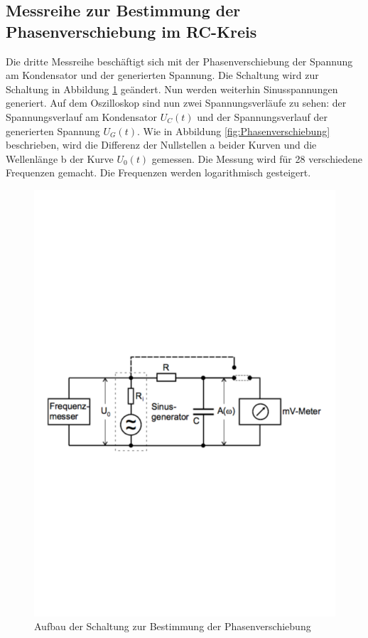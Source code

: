 \subsection{Messreihe zur Bestimmung der Phasenverschiebung im RC-Kreis}
Die dritte Messreihe beschäftigt sich mit der Phasenverschiebung der Spannung am Kondensator und der generierten Spannung.
Die Schaltung wird zur Schaltung in Abbildung \ref{fig:Aufbau2} geändert.
Nun werden weiterhin Sinusspannungen generiert.
Auf dem Oszilloskop sind nun zwei Spannungsverläufe zu sehen: der Spannungsverlauf am Kondensator $U_{C}(t)$ und der Spannungsverlauf der generierten Spannung $U_{G}(t)$.
Wie in Abbildung \ref{fig:Phasenverschiebung} beschrieben, wird die Differenz der Nullstellen a beider Kurven und die Wellenlänge b der Kurve $U_{0}(t)$ gemessen.
Die Messung wird für 28 verschiedene Frequenzen gemacht.
Die Frequenzen werden logarithmisch gesteigert.

\begin{figure}[h!]
  \centering
  \includegraphics[width=\textwidth]{Aufbau2.pdf}
  \caption{Aufbau der Schaltung zur Bestimmung der Phasenverschiebung \cite{1}}
  \label{fig:Aufbau2}
\end{figure}

